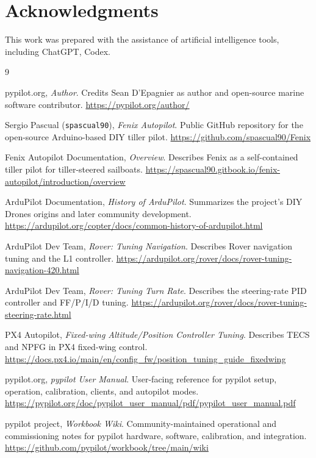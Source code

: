 \documentclass[10pt,twocolumn]{article}
\begin{document}
\FloatBarrier

\section*{Acknowledgments}
This work was prepared with the assistance of artificial intelligence tools, including ChatGPT, Codex.

\begin{thebibliography}{9}

pypilot.org,
\emph{Author}.  Credits Sean D'Epagnier as author and open-source marine software contributor.
\url{https://pypilot.org/author/}

Sergio Pascual (\texttt{spascual90}),
\emph{Fenix Autopilot}.  Public GitHub repository for the open-source Arduino-based DIY tiller pilot.
\url{https://github.com/spascual90/Fenix}

Fenix Autopilot Documentation,
\emph{Overview}.  Describes Fenix as a self-contained tiller pilot for tiller-steered sailboats.
\url{https://spascual90.gitbook.io/fenix-autopilot/introduction/overview}

ArduPilot Documentation,
\emph{History of ArduPilot}.  Summarizes the project's DIY Drones origins and later community development.
\url{https://ardupilot.org/copter/docs/common-history-of-ardupilot.html}

ArduPilot Dev Team,
\emph{Rover: Tuning Navigation}.  Describes Rover navigation tuning and the L1 controller.
\url{https://ardupilot.org/rover/docs/rover-tuning-navigation-420.html}

ArduPilot Dev Team,
\emph{Rover: Tuning Turn Rate}.  Describes the steering-rate PID controller and FF/P/I/D tuning.
\url{https://ardupilot.org/rover/docs/rover-tuning-steering-rate.html}

PX4 Autopilot,
\emph{Fixed-wing Altitude/Position Controller Tuning}.  Describes TECS and NPFG in PX4 fixed-wing control.
\url{https://docs.px4.io/main/en/config_fw/position_tuning_guide_fixedwing}

pypilot.org,
\emph{pypilot User Manual}.  User-facing reference for pypilot setup, operation, calibration,
clients, and autopilot modes.
\url{https://pypilot.org/doc/pypilot_user_manual/pdf/pypilot_user_manual.pdf}

pypilot project,
\emph{Workbook Wiki}.  Community-maintained operational and commissioning notes for pypilot
hardware, software, calibration, and integration.
\url{https://github.com/pypilot/workbook/tree/main/wiki}


\end{thebibliography}
\end{document}
